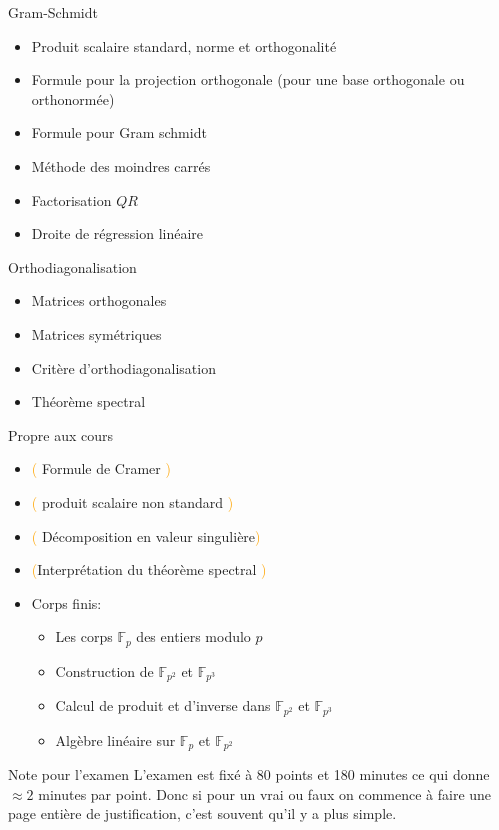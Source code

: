 \begin{parag}{Gram-Schmidt}
    \begin{itemize}
        \item Produit scalaire standard, norme et orthogonalité
        \item Formule pour la projection orthogonale (pour une base orthogonale ou orthonormée)
        \item Formule pour Gram schmidt
        \item Méthode des moindres carrés
        \item Factorisation $QR$
        \item Droite de régression linéaire
    \end{itemize}
\end{parag}
\begin{parag}{Orthodiagonalisation}
    \begin{itemize}
        \item Matrices orthogonales
        \item Matrices symétriques
        \item Critère d'orthodiagonalisation
        \item Théorème spectral
    \end{itemize}
\end{parag}
\begin{parag}{Propre aux cours}
    \begin{itemize}
        \item \textcolor{orange}{(} Formule de Cramer \textcolor{orange}{)}
        \item \textcolor{orange}{(} produit scalaire non standard \textcolor{orange}{)}
        \item \textcolor{orange}{(} Décomposition en valeur singulière\textcolor{orange}{)}
        \item \textcolor{orange}{(}Interprétation du théorème spectral \textcolor{orange}{)}
        \item Corps finis:
        \begin{itemize}
            \item Les corps $\mathbb{F}_p$ des entiers modulo $p$
            \item Construction de $\mathbb{F}_{p^2}$ et $\mathbb{F}_{p^3}$
            \item Calcul de produit et d'inverse dans $\mathbb{F}_{p^2}$ et $\mathbb{F}_{p^3}$
            \item Algèbre linéaire sur $\mathbb{F}_p$ et $\mathbb{F}_{p^2}$
        \end{itemize}
    \end{itemize}
\end{parag}
\begin{parag}{Note pour l'examen}
    L'examen est fixé à $80$ points et 180 minutes ce qui donne $\approx 2$ minutes par point. Donc si pour un vrai ou faux on commence à faire une page entière de justification, c'est souvent qu'il y a plus simple.
\end{parag}